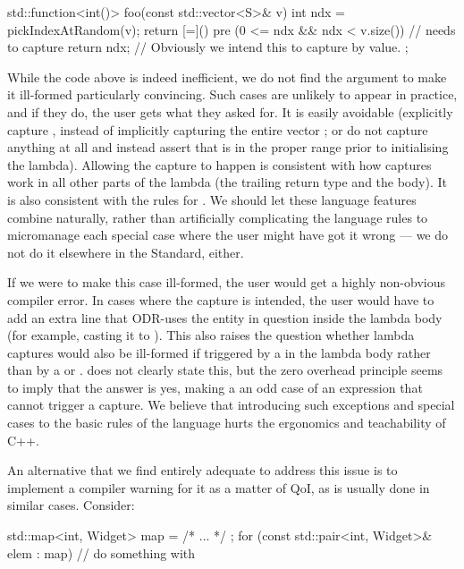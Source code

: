\begin{codeblock}
std::function<int()> foo(const std::vector<S>& v)
{
  int ndx = pickIndexAtRandom(v);
  return [=]()
    pre (0 <= ndx && ndx < v.size()) // needs to capture 
  {
    return ndx; // Obviously we intend this to capture  by value.
  }; 
}
\end{codeblock} 

While the code above is indeed inefficient, we do not find the argument to make it ill-formed particularly convincing.  Such cases are unlikely to appear in practice, and if they do, the user gets what they asked for. It is easily avoidable (explicitly capture , instead of implicitly capturing the entire vector ; or do not capture anything at all and instead assert that  is in the proper range prior to initialising the lambda). Allowing the capture to happen is consistent with how captures work in all other parts of the lambda (the trailing return type and the body). It is also consistent with the rules for \tcode{[[assume]]}. We should let these language features combine naturally, rather than artificially complicating the language rules to micromanage each special case where the user might have got it wrong --- we do not do it elsewhere in the Standard, either.

If we were to make this case ill-formed, the user would get a highly non-obvious compiler error. In cases where the capture is intended, the user would have to add an extra line that ODR-uses the entity in question inside the lambda body (for example, casting it to ). This also raises the question whether lambda captures would also be ill-formed if triggered by a  in the lambda body rather than by a  or . \cite{P2932R1} does not clearly state this, but the zero overhead principle seems to imply that the answer is yes, making a  an odd case of an expression that cannot trigger a capture. We believe that introducing such exceptions and special cases to the basic rules of the language hurts the ergonomics and teachability of C++.

An alternative that we find entirely adequate to address this issue is to implement a compiler warning for it as a matter of QoI, as is usually done in similar cases. Consider:

\begin{codeblock}
std::map<int, Widget> map = { /* ... */ };
for (const std::pair<int, Widget>& elem : map)
  // do something with 
\end{codeblock}

